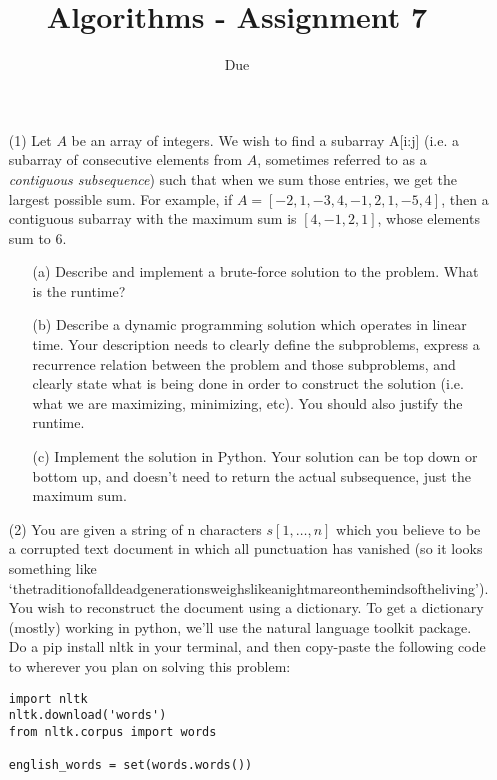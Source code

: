 \documentclass[12pt]{article}
\title{Algorithms - Assignment 7}
\date{Due }
\begin{document}
\maketitle

\begin{enumerate}
    \item[(1)] Let $A$ be an array of integers. We wish to find a subarray A[i:j] (i.e. a subarray of consecutive elements from $A$, sometimes referred to as a 
    \emph{contiguous subsequence}) such that when we sum those entries, we get the largest possible sum. For example, if $A=[-2, 1, -3, 4, -1, 2, 1, -5, 4]$, then a contiguous subarray with the maximum sum is $[4,-1,2,1]$, whose elements sum to $6$.
    \begin{itemize}
        \item[(a)] Describe and implement a brute-force solution to the problem. What is the runtime? 
        \item[(b)] Describe a dynamic programming solution which operates in linear time. Your description needs to clearly define the subproblems, express a recurrence relation between the problem and those subproblems, and clearly state what is being done in order to construct the solution (i.e. what we are maximizing, minimizing, etc). You should also justify the runtime. 
        \item[(c)] Implement the solution in Python. Your solution can be top down or bottom up, and doesn't need to return the actual subsequence, just the maximum sum. 
    \end{itemize}
    \item[(2)] You are given a string of n characters $s[1,\ldots,n]$ which you believe to be a corrupted text document in which all punctuation has vanished (so it looks something like `thetraditionofalldeadgenerationsweighslikeanightmareonthemindsoftheliving'). You wish to reconstruct the document using a dictionary. To get a dictionary (mostly) working in python, we'll use the natural language toolkit package. Do a pip install nltk in your terminal, and then copy-paste the following code to wherever you plan on solving this problem: 
    \begin{verbatim}
import nltk
nltk.download('words')
from nltk.corpus import words

english_words = set(words.words())


\end{verbatim}
\end{enumerate}
\end{document}
